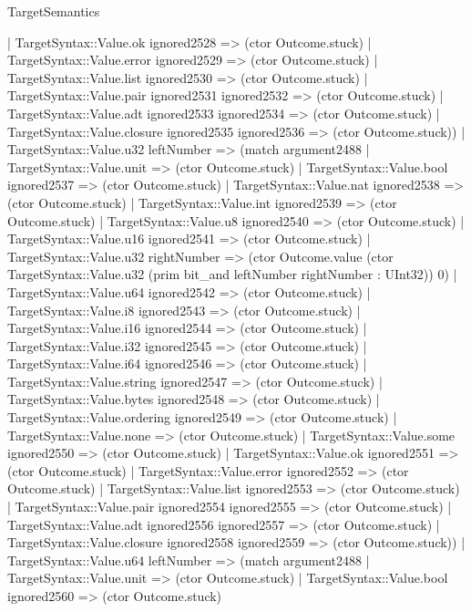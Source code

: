 \begin{lexlean}{TargetSemantics}
\begin{semanticmodule}
{              | TargetSyntax::Value.ok ignored2528 => (ctor Outcome.stuck)
              | TargetSyntax::Value.error ignored2529 => (ctor Outcome.stuck)
              | TargetSyntax::Value.list ignored2530 => (ctor Outcome.stuck)
              | TargetSyntax::Value.pair ignored2531 ignored2532 => (ctor Outcome.stuck)
              | TargetSyntax::Value.adt ignored2533 ignored2534 => (ctor Outcome.stuck)
              | TargetSyntax::Value.closure ignored2535 ignored2536 => (ctor Outcome.stuck))
            | TargetSyntax::Value.u32 leftNumber => (match argument2488
              | TargetSyntax::Value.unit => (ctor Outcome.stuck)
              | TargetSyntax::Value.bool ignored2537 => (ctor Outcome.stuck)
              | TargetSyntax::Value.nat ignored2538 => (ctor Outcome.stuck)
              | TargetSyntax::Value.int ignored2539 => (ctor Outcome.stuck)
              | TargetSyntax::Value.u8 ignored2540 => (ctor Outcome.stuck)
              | TargetSyntax::Value.u16 ignored2541 => (ctor Outcome.stuck)
              | TargetSyntax::Value.u32 rightNumber => (ctor Outcome.value (ctor TargetSyntax::Value.u32 (prim bit_and leftNumber rightNumber : UInt32)) 0)
              | TargetSyntax::Value.u64 ignored2542 => (ctor Outcome.stuck)
              | TargetSyntax::Value.i8 ignored2543 => (ctor Outcome.stuck)
              | TargetSyntax::Value.i16 ignored2544 => (ctor Outcome.stuck)
              | TargetSyntax::Value.i32 ignored2545 => (ctor Outcome.stuck)
              | TargetSyntax::Value.i64 ignored2546 => (ctor Outcome.stuck)
              | TargetSyntax::Value.string ignored2547 => (ctor Outcome.stuck)
              | TargetSyntax::Value.bytes ignored2548 => (ctor Outcome.stuck)
              | TargetSyntax::Value.ordering ignored2549 => (ctor Outcome.stuck)
              | TargetSyntax::Value.none => (ctor Outcome.stuck)
              | TargetSyntax::Value.some ignored2550 => (ctor Outcome.stuck)
              | TargetSyntax::Value.ok ignored2551 => (ctor Outcome.stuck)
              | TargetSyntax::Value.error ignored2552 => (ctor Outcome.stuck)
              | TargetSyntax::Value.list ignored2553 => (ctor Outcome.stuck)
              | TargetSyntax::Value.pair ignored2554 ignored2555 => (ctor Outcome.stuck)
              | TargetSyntax::Value.adt ignored2556 ignored2557 => (ctor Outcome.stuck)
              | TargetSyntax::Value.closure ignored2558 ignored2559 => (ctor Outcome.stuck))
            | TargetSyntax::Value.u64 leftNumber => (match argument2488
              | TargetSyntax::Value.unit => (ctor Outcome.stuck)
              | TargetSyntax::Value.bool ignored2560 => (ctor Outcome.stuck)
}
\end{semanticmodule}
\end{lexlean}
